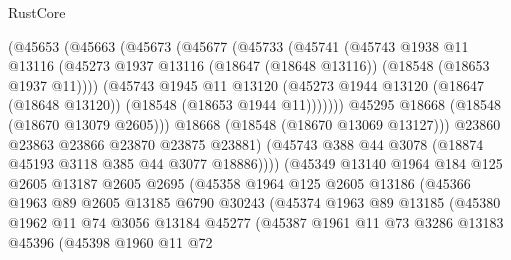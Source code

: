 \begin{lexlean}{RustCore}
\begin{coremodule}
                  (@45653
                    (@45663
                      (@45673
                        (@45677
                          (@45733
                            (@45741
                              (@45743
                                @1938
                                @11
                                @13116
                                (@45273
                                  @1937
                                  @13116
                                  (@18647 (@18648 @13116))
                                  (@18548 (@18653 @1937 @11))))
                              (@45743
                                @1945
                                @11
                                @13120
                                (@45273
                                  @1944
                                  @13120
                                  (@18647 (@18648 @13120))
                                  (@18548 (@18653 @1944 @11)))))))
                        @45295
                        @18668
                        (@18548 (@18670 @13079 @2605)))
                      @18668
                      (@18548 (@18670 @13069 @13127)))
                    @23860
                    @23863
                    @23866
                    @23870
                    @23875
                    @23881)
                  (@45743 @388 @44 @3078 (@18874 @45193 @3118 @385 @44 @3077 @18886))))
              (@45349
                @13140
                @1964
                @184
                @125
                @2605
                @13187
                @2605
                @2695
                (@45358
                  @1964
                  @125
                  @2605
                  @13186
                  (@45366
                    @1963
                    @89
                    @2605
                    @13185
                    @6790
                    @30243
                    (@45374
                      @1963
                      @89
                      @13185
                      (@45380
                        @1962
                        @11
                        @74
                        @3056
                        @13184
                        @45277
                        (@45387
                          @1961
                          @11
                          @73
                          @3286
                          @13183
                          @45396
                          (@45398
                            @1960
                            @11
                            @72

\end{coremodule}
\end{lexlean}
